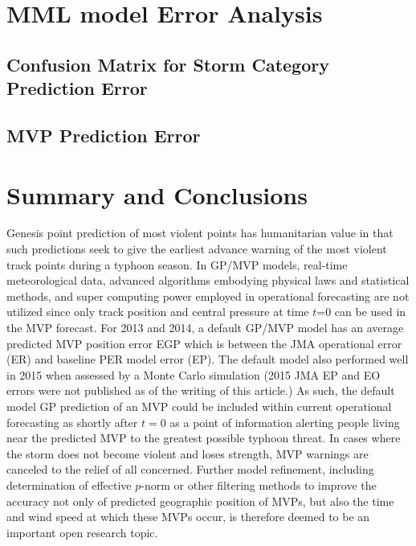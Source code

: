 \documentclass[a4paper, 12pt]{article}
\begin{document}
{\section{MML model Error Analysis}

\subsection{Confusion Matrix for Storm Category Prediction Error}

\subsection{MVP Prediction Error}

\section{Summary and Conclusions}

Genesis point prediction of most violent points has humanitarian value in that such predictions seek to give the earliest advance warning of the most violent track points during a typhoon season. In GP/MVP models, real-time meteorological data, advanced algorithms embodying physical laws and statistical methods, and super computing power employed in operational forecasting are not utilized since only track position and central pressure at time $t$=0 can be used in the MVP forecast.  For 2013 and 2014, a default GP/MVP model has an average predicted MVP position error EGP which is between the JMA operational error (ER) and baseline PER model error (EP).
  The default model also performed well in 2015 when assessed by a Monte Carlo simulation (2015 JMA EP and EO errors were not published as of the writing of this article.)  As such, the default model GP prediction of an MVP could be included within current operational forecasting as shortly after $t=0$ as a point of information alerting people living near the predicted MVP to the greatest possible typhoon threat. In cases where the storm does not become violent and loses strength, MVP warnings are canceled to the relief of all concerned.  Further model refinement, including determination of effective $p$-norm or other filtering methods to improve the accuracy not only of predicted geographic position of MVPs, but also the time and wind speed at which these MVPs occur, is therefore deemed to be an important open research topic.

\newpage




}
\end{document}
